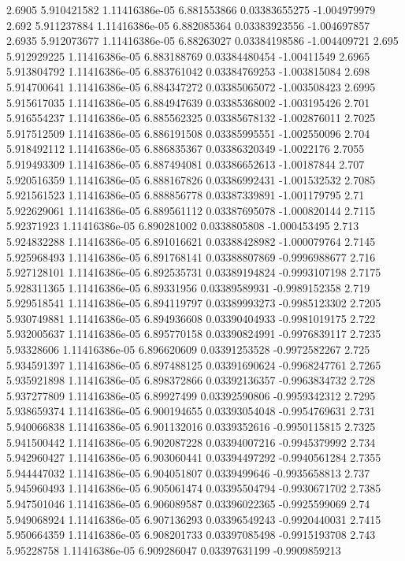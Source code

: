 {2.6905 5.910421582 1.11416386e-05 6.881553866 0.03383655275 -1.004979979
2.692 5.911237884 1.11416386e-05 6.882085364 0.03383923556 -1.004697857
2.6935 5.912073677 1.11416386e-05 6.88263027 0.03384198586 -1.004409721
2.695 5.912929225 1.11416386e-05 6.883188769 0.03384480454 -1.00411549
2.6965 5.913804792 1.11416386e-05 6.883761042 0.03384769253 -1.003815084
2.698 5.914700641 1.11416386e-05 6.884347272 0.03385065072 -1.003508423
2.6995 5.915617035 1.11416386e-05 6.884947639 0.03385368002 -1.003195426
2.701 5.916554237 1.11416386e-05 6.885562325 0.03385678132 -1.002876011
2.7025 5.917512509 1.11416386e-05 6.886191508 0.03385995551 -1.002550096
2.704 5.918492112 1.11416386e-05 6.886835367 0.03386320349 -1.0022176
2.7055 5.919493309 1.11416386e-05 6.887494081 0.03386652613 -1.00187844
2.707 5.920516359 1.11416386e-05 6.888167826 0.03386992431 -1.001532532
2.7085 5.921561523 1.11416386e-05 6.888856778 0.03387339891 -1.001179795
2.71 5.922629061 1.11416386e-05 6.889561112 0.03387695078 -1.000820144
2.7115 5.92371923 1.11416386e-05 6.890281002 0.0338805808 -1.000453495
2.713 5.924832288 1.11416386e-05 6.891016621 0.03388428982 -1.000079764
2.7145 5.925968493 1.11416386e-05 6.891768141 0.03388807869 -0.9996988677
2.716 5.927128101 1.11416386e-05 6.892535731 0.03389194824 -0.9993107198
2.7175 5.928311365 1.11416386e-05 6.89331956 0.03389589931 -0.9989152358
2.719 5.929518541 1.11416386e-05 6.894119797 0.03389993273 -0.9985123302
2.7205 5.930749881 1.11416386e-05 6.894936608 0.03390404933 -0.9981019175
2.722 5.932005637 1.11416386e-05 6.895770158 0.03390824991 -0.9976839117
2.7235 5.93328606 1.11416386e-05 6.896620609 0.03391253528 -0.9972582267
2.725 5.934591397 1.11416386e-05 6.897488125 0.03391690624 -0.9968247761
2.7265 5.935921898 1.11416386e-05 6.898372866 0.03392136357 -0.9963834732
2.728 5.937277809 1.11416386e-05 6.89927499 0.03392590806 -0.9959342312
2.7295 5.938659374 1.11416386e-05 6.900194655 0.03393054048 -0.9954769631
2.731 5.940066838 1.11416386e-05 6.901132016 0.0339352616 -0.9950115815
2.7325 5.941500442 1.11416386e-05 6.902087228 0.03394007216 -0.9945379992
2.734 5.942960427 1.11416386e-05 6.903060441 0.03394497292 -0.9940561284
2.7355 5.944447032 1.11416386e-05 6.904051807 0.0339499646 -0.9935658813
2.737 5.945960493 1.11416386e-05 6.905061474 0.03395504794 -0.9930671702
2.7385 5.947501046 1.11416386e-05 6.906089587 0.03396022365 -0.9925599069
2.74 5.949068924 1.11416386e-05 6.907136293 0.03396549243 -0.9920440031
2.7415 5.950664359 1.11416386e-05 6.908201733 0.03397085498 -0.9915193708
2.743 5.95228758 1.11416386e-05 6.909286047 0.03397631199 -0.9909859213
}
